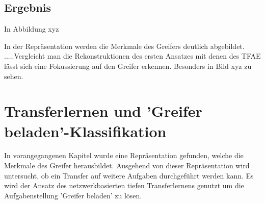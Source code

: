 	\subsection{Ergebnis}
	
	In Abbildung  xyz
	
	In der Repräsentation werden die Merkmale des Greifers deutlich abgebildet. .....Vergleicht man die Rekonstruktionen des ersten Ansatzes mit denen des TFAE lässt sich eine Fokussierung auf den Greifer erkennen. Besonders in Bild xyz zu sehen.
	
	
	
	\section{Transferlernen und 'Greifer beladen'-Klassifikation}
	\label{sec:TransferLearningGrappleLoaded}
	In vorangegangenen Kapitel wurde eine Repräsentation gefunden, welche die Merkmale des Greifer herausbildet. Ausgehend von dieser Repräsentation wird untersucht, ob ein Transfer auf weitere Aufgaben durchgeführt werden kann. Es wird der Ansatz des netzwerkbasierten tiefen Transferlernens genutzt um die Aufgabenstellung 'Greifer beladen' zu lösen.
